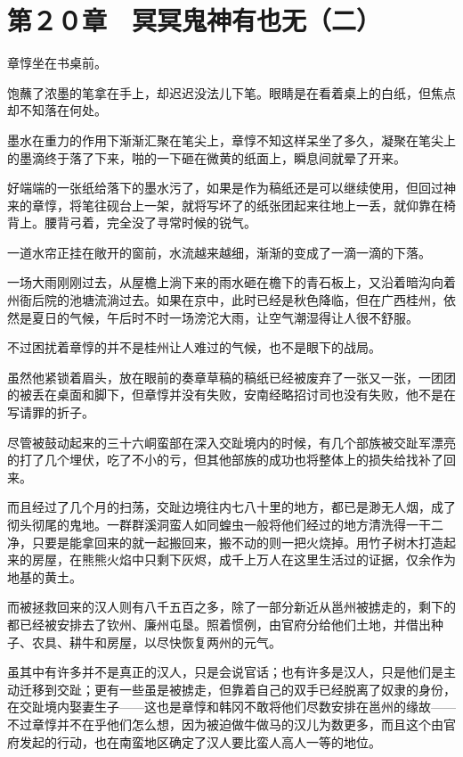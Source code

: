 \section{第２０章　冥冥鬼神有也无（二）}

章惇坐在书桌前。

饱蘸了浓墨的笔拿在手上，却迟迟没法儿下笔。眼睛是在看着桌上的白纸，但焦点却不知落在何处。

墨水在重力的作用下渐渐汇聚在笔尖上，章惇不知这样呆坐了多久，凝聚在笔尖上的墨滴终于落了下来，啪的一下砸在微黄的纸面上，瞬息间就晕了开来。

好端端的一张纸给落下的墨水污了，如果是作为稿纸还是可以继续使用，但回过神来的章惇，将笔往砚台上一架，就将写坏了的纸张团起来往地上一丢，就仰靠在椅背上。腰背弓着，完全没了寻常时候的锐气。

一道水帘正挂在敞开的窗前，水流越来越细，渐渐的变成了一滴一滴的下落。

一场大雨刚刚过去，从屋檐上淌下来的雨水砸在檐下的青石板上，又沿着暗沟向着州衙后院的池塘流淌过去。如果在京中，此时已经是秋色降临，但在广西桂州，依然是夏日的气候，午后时不时一场滂沱大雨，让空气潮湿得让人很不舒服。

不过困扰着章惇的并不是桂州让人难过的气候，也不是眼下的战局。

虽然他紧锁着眉头，放在眼前的奏章草稿的稿纸已经被废弃了一张又一张，一团团的被丢在桌面和脚下，但章惇并没有失败，安南经略招讨司也没有失败，他不是在写请罪的折子。

尽管被鼓动起来的三十六峒蛮部在深入交趾境内的时候，有几个部族被交趾军漂亮的打了几个埋伏，吃了不小的亏，但其他部族的成功也将整体上的损失给找补了回来。

而且经过了几个月的扫荡，交趾边境往内七八十里的地方，都已是渺无人烟，成了彻头彻尾的鬼地。一群群溪洞蛮人如同蝗虫一般将他们经过的地方清洗得一干二净，只要是能拿回来的就一起搬回来，搬不动的则一把火烧掉。用竹子树木打造起来的房屋，在熊熊火焰中只剩下灰烬，成千上万人在这里生活过的证据，仅余作为地基的黄土。

而被拯救回来的汉人则有八千五百之多，除了一部分新近从邕州被掳走的，剩下的都已经被安排去了钦州、廉州屯垦。照着惯例，由官府分给他们土地，并借出种子、农具、耕牛和房屋，以尽快恢复两州的元气。

虽其中有许多并不是真正的汉人，只是会说官话；也有许多是汉人，只是他们是主动迁移到交趾；更有一些虽是被掳走，但靠着自己的双手已经脱离了奴隶的身份，在交趾境内娶妻生子——这也是章惇和韩冈不敢将他们尽数安排在邕州的缘故——不过章惇并不在乎他们怎么想，因为被迫做牛做马的汉儿为数更多，而且这个由官府发起的行动，也在南蛮地区确定了汉人要比蛮人高人一等的地位。

